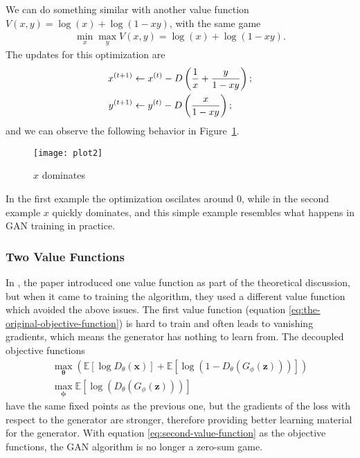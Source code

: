 \begin{example} We can do something similar with another value
  function $V(x, y) = \log(x) + \log(1 - xy)$, with the same game
  \begin{align} \min_x\max_y V(x, y) = \log(x) + \log(1 - xy).
  \end{align} The updates for this optimization are
  \begin{align} x^{(t+1)} & \gets x^{(t)} - D \left( {1 \over x} + {y
        \over 1 - xy} \right); \\ y^{(t+1)} & \gets y^{(t)} - D \left(
      {x \over 1 - xy} \right);
  \end{align} and we can observe the following behavior in
  Figure~\ref{fig:drop}.

  \begin{figure}[H] \centering
    \texttt{[image: plot2]}
    \caption{$x$ dominates}
    \label{fig:drop}
  \end{figure}

\end{example}

In the first example the optimization oscilates around 0, while in the
second example $x$ quickly dominates, and this simple example
resembles what happens in GAN training in practice.

\subsubsection{Two Value Functions}
\label{sec:two-value}

In \cite{ref:goodfellow-original}, the paper introduced one value
function as part of the theoretical discussion, but when it came to
training the algorithm, they used a different value function which
avoided the above issues. The first value function (equation
\ref{eq:the-original-objective-function}) is hard to train and often
leads to vanishing gradients, which means the generator has nothing to
learn from. The decoupled objective functions
\begin{align}
  \label{eq:second-value-function} \max_{\mathbf{\theta}} \left(
  \mathbb{E}\left[\log{D_\theta(\mathbf{x})}\right] +
  \mathbb{E}\left[\log(1 - D_\theta(G_\phi(\mathbf{z})))\right]
  \right) \\
  \max_{\mathbf{\phi}}\mathbb{E}\left[\log(D_\theta(G_\phi(\mathbf{z})))\right]
\end{align} have the same fixed points as the previous one, but the
gradients of the loss with respect to the generator are stronger,
therefore providing better learning material for the generator. With
equation \ref{eq:second-value-function} as the objective functions,
the GAN algorithm is no longer a zero-sum game.


